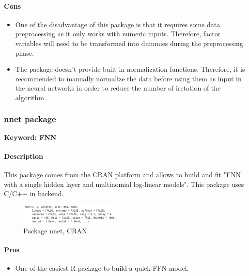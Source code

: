 \documentclass[6pt,letter]{article}\usepackage[]{graphicx}\usepackage[]{color}
\begin{document}
\paragraph{Cons}
\begin{itemize}
\item One of the disadvantage of this package is that it requires some data preprocessing as it only works with numeric inputs. Therefore, factor variables will need to be transformed into dummies during the preprocessing phase. 
\item The package doesn't provide built-in normalization functions. Therefore, it is recommended to manually normalize the data before using them as input in the neural networks in order to reduce the number of iretation of the algorithm.
\end{itemize}

\subsubsection{nnet package}
\textbf{Keyword: FNN}
\paragraph{Description}
This package comes from the CRAN platform and allows to build and fit "FNN with a single hidden layer and multinomial log-linear models". This package uses C/C++ in backend.
\begin{figure}[h]
    \centering
    \includegraphics[width=0.45\textwidth]{figure/nnet_package.png}
     \caption{Package nnet, CRAN}
\end{figure}
\paragraph{Pros}
\begin{itemize}
\item One of the easiest R package to build a quick FFN model.
\end{itemize}
\end{document}
